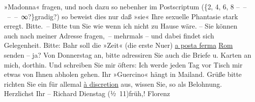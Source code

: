 \begin{ledgroupsized}[t]{13cm}
               »Madonna«
               fragen, und noch dazu so nebenher im Postscriptum ({\{}2, 4, 6, 8 – – – – ∞?{\}}gradig?) so beweist dies nur daß »sie« Ihre
               sexuelle Phantasie stark erregt. Bitte. – Bitte tun Sie wie wenn ich nicht zu Hause
               wäre. – Sie können auch nach meiner Adresse fragen, – mehrmals – {\pb}und dabei findet sich
               Gelegenheit.\pend
           \pstart
           Bitte: Bahr soll die »Zeit« (die erste Nu{\geminationm}er) \uline{a posta ferma}{ }\uline{Rom} senden – ja? Von Donnerstag an, bitte adressiren Sie auch die
               Briefe u. Karten an mich, dorthin. Und schreiben Sie mir öfters: Ich werde jeden Tag
               vor Tisch mir etwas von Ihnen abholen gehen. Ihr »Guercino« hängt in Mailand. Grüße bitte richten Sie
               ein für allemal \uline{à discretion} aus, wissen Sie, so als
               Belohnung. Herzlichst Ihr –\pend
           \pstart \spacefill\mbox{Richard}\pend{}\pstart
           Dienstag{ }\introOben{}(½ 11)\introOben{}{ }früh,! Florenz\pend
           
         
         \endnumbering{}\end{ledgroupsized}  \newcommand{\dateiname}{L00375}\newcommand{\titel}{Richard Beer-Hofmann an Arthur Schnitzler, [2. 10. 1894]}\newcommand{\editorInnen}{ Martin Anton Müller und Gerd-Hermann Susen}
      